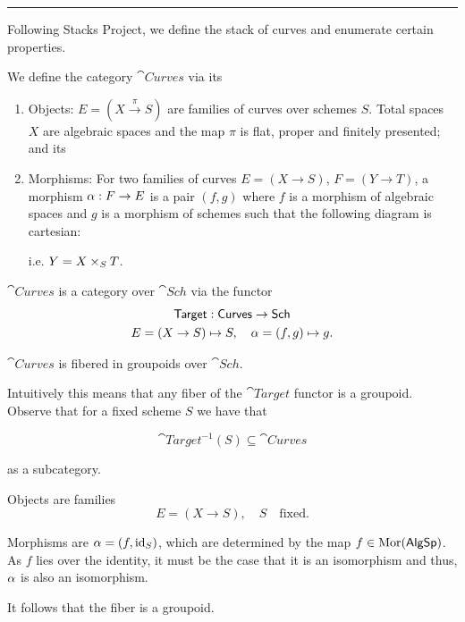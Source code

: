 \documentclass[12pt]{memoir}
\begin{document}
\hrule

Following Stacks Project, we define the stack of curves and enumerate certain properties.

\begin{Def}\label{def-category-of-curves}
    We define the category \(\cat{Curves}\) via its
    \begin{enumerate}
        \item Objects: \(E=(X\xrightarrow{\pi}S)\) are families of curves over schemes \(S\). Total spaces \(X\) are algebraic spaces and the map \(\pi\) is flat, proper and finitely presented; and its
        \item Morphisms: For two families of curves \(E=(X\to S)\), \(F=(Y\to T)\), a morphism \(\alpha:F\to E\) is a pair \((f,g)\) where \(f\) is a morphism of algebraic spaces and \(g\) is a morphism of schemes such that the following diagram is cartesian:
        \begin{center}
        \end{center}
        i.e. \(Y=X\times_ST\).
    \end{enumerate}
\end{Def}

\begin{Prop}
    \(\cat{Curves}\) is a category over \(\cat{Sch}\) via the functor 
    \begin{gather*}
        \mathsf{Target}:\mathsf{Curves}\to\mathsf{Sch}\\
        E=(X\to S)\mapsto S,\quad \alpha=(f,g)\mapsto g.
    \end{gather*}
\end{Prop}

\begin{Th}
    \(\cat{Curves}\) is fibered in groupoids over \(\cat{Sch}\).
\end{Th}

Intuitively this means that any fiber of the \(\cat{Target}\) functor is a groupoid. Observe that for a fixed scheme \(S\) we have that 

\[\cat{Target}^{-1}(S)\subseteq \cat{Curves}\]

as a subcategory.\par
Objects are families 
\[E=(X\to S),\quad S\quad\text{fixed}.\] 

Morphisms are \(\alpha=(f,\operatorname{id}_S)\), which are determined by the map \(f\in\operatorname{Mor}(\mathsf{AlgSp})\). As \(f\) lies over the identity, it must be the case that it is an isomorphism and thus, \(\alpha\) is also an isomorphism.\par
It follows that the fiber is a groupoid.
\end{document}
